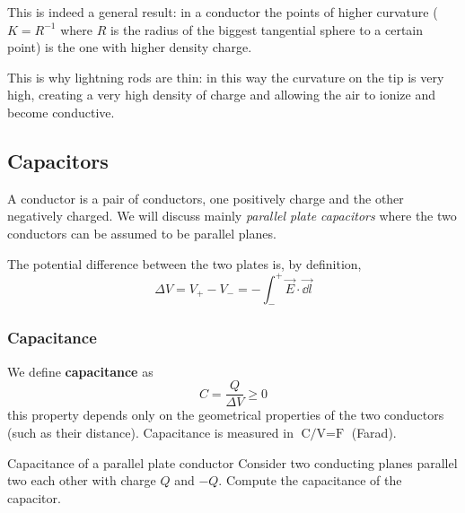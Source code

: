 \documentclass[12pt]{extarticle}
\begin{document}
This is indeed a general result: in a conductor the points of higher curvature ($K = R^{-1}$ where $R$ is the radius of the biggest tangential sphere to a certain point) is the one with higher density charge.

This is why lightning rods are thin: in this way the curvature on the tip is very high, creating a very high density of charge and allowing the air to ionize and become conductive.

\subsection{Capacitors}

A conductor is a pair of conductors, one positively charge and the other negatively charged.
We will discuss mainly \emph{parallel plate capacitors} where the two conductors can be assumed to be parallel planes.

The potential difference between the two plates is, by definition,
\begin{equation}
    \Delta V = V_+ - V_- = - \int_-^+ \vec E \cdot \vec{\dd l}
\end{equation}

\subsubsection{Capacitance}

We define \textbf{capacitance} as
\begin{equation}
    \label{eq:capacitance}
    C = \frac{Q}{\Delta V} \geq 0
\end{equation}
this property depends only on the geometrical properties of the two conductors (such as their distance).
Capacitance is measured in $\si{\coulomb \per \volt} = \si{\farad}$ (Farad).

\begin{example}{Capacitance of a parallel plate conductor}{}
    Consider two conducting planes parallel two each other with charge $Q$ and $-Q$.
    Compute the capacitance of the capacitor.
\end{example}
\end{document}

